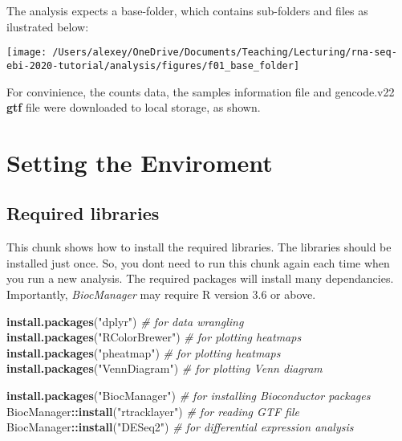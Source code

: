 \documentclass[]{book}
\newenvironment{Shaded}{\begin{snugshade}}{\end{snugshade}}
\newcommand{\KeywordTok}[1]{\textcolor[rgb]{0.13,0.29,0.53}{\textbf{#1}}}
\newcommand{\StringTok}[1]{\textcolor[rgb]{0.31,0.60,0.02}{#1}}
\newcommand{\CommentTok}[1]{\textcolor[rgb]{0.56,0.35,0.01}{\textit{#1}}}
\newcommand{\OperatorTok}[1]{\textcolor[rgb]{0.81,0.36,0.00}{\textbf{#1}}}
\newcommand{\NormalTok}[1]{#1}
\begin{document}
The analysis expects a base-folder, which contains sub-folders and files
as ilustrated below:

\begin{center}\texttt{[image: /Users/alexey/OneDrive/Documents/Teaching/Lecturing/rna-seq-ebi-2020-tutorial/analysis/figures/f01\_base\_folder]} \end{center}

For convinience, the counts data, the samples information file and
gencode.v22 \textbf{gtf} file were downloaded to local storage, as
shown.

\chapter{Setting the Enviroment}\label{setting-the-enviroment}

\section{Required libraries}\label{required-libraries}

This chunk shows how to install the required libraries. The libraries
should be installed just once. So, you dont need to run this chunk again
each time when you run a new analysis. The required packages will
install many dependancies. Importantly, \emph{BiocManager} may require R
version 3.6 or above.

\begin{Shaded}
\begin{Highlighting}[]
\KeywordTok{install.packages}\NormalTok{(}\StringTok{"dplyr"}\NormalTok{) }\CommentTok{# for data wrangling}
\KeywordTok{install.packages}\NormalTok{(}\StringTok{"RColorBrewer"}\NormalTok{) }\CommentTok{# for plotting heatmaps}
\KeywordTok{install.packages}\NormalTok{(}\StringTok{"pheatmap"}\NormalTok{) }\CommentTok{# for plotting heatmaps}
\KeywordTok{install.packages}\NormalTok{(}\StringTok{"VennDiagram"}\NormalTok{) }\CommentTok{# for plotting Venn diagram}

\KeywordTok{install.packages}\NormalTok{(}\StringTok{"BiocManager"}\NormalTok{) }\CommentTok{# for installing Bioconductor packages}
\NormalTok{BiocManager}\OperatorTok{::}\KeywordTok{install}\NormalTok{(}\StringTok{"rtracklayer"}\NormalTok{) }\CommentTok{# for reading GTF file}
\NormalTok{BiocManager}\OperatorTok{::}\KeywordTok{install}\NormalTok{(}\StringTok{"DESeq2"}\NormalTok{) }\CommentTok{# for differential expression analysis}
\end{Highlighting}
\end{Shaded}
\end{document}
